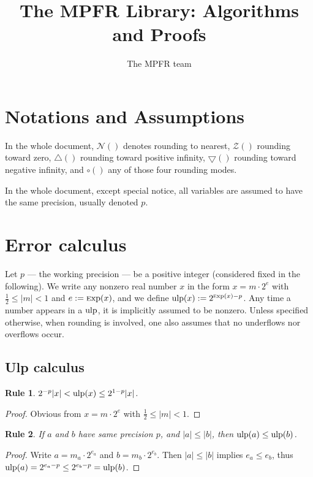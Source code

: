 \documentclass[12pt]{amsart}
\title{The MPFR Library: Algorithms and Proofs}
\author{The MPFR team}
\def\pinf{\bigtriangleup}
\def\minf{\bigtriangledown}
\def\ulp{{\rm ulp}}
\def\Exp{{\rm \textsc exp}}
\def\Z{{\mathcal Z}}
\def\N{{\mathcal N}}
\newtheorem{Rule}{Rule}
\begin{document}
\maketitle

\tableofcontents

\section{Notations and Assumptions}

In the whole document, $\N()$ denotes rounding to nearest,
$\Z()$ rounding toward zero,
$\pinf()$ rounding toward positive infinity,
$\minf()$ rounding toward negative infinity,
and $\circ()$ any of those four rounding modes.

In the whole document, except special notice, all variables are assumed
to have the same precision, usually denoted $p$.

\section{Error calculus}

Let $p$ --- the working precision ---
be a positive integer (considered fixed in the following).
We write any nonzero real number $x$ in the form $x = m \cdot 2^e$
with $\frac{1}{2} \le |m| < 1$ and $e := \Exp(x)$, and
we define $\ulp(x) := 2^{\Exp(x) - p}$.
Any time a number appears in a $\ulp$, it is implicitly assumed to be
nonzero. Unless specified otherwise, when rounding is involved, one
also assumes that no underflows nor overflows occur.

\subsection{Ulp calculus}


\begin{Rule} \label{R1}
$2^{-p} |x| < \ulp(x) \le 2^{1-p} |x|$.
\end{Rule}
\begin{proof}
Obvious from $x = m \cdot 2^e$ with $\frac{1}{2} \le |m| < 1$.
\end{proof}

\begin{Rule} \label{R2}
If $a$ and $b$ have same precision $p$,
and $|a| \le |b|$, then $\ulp(a) \le \ulp(b)$.
\end{Rule}
\begin{proof}
Write $a = m_a \cdot 2^{e_a}$ and $b = m_b \cdot 2^{e_b}$.
Then $|a| \le |b|$ implies $e_a \le e_b$, thus
$\ulp(a) = 2^{e_a-p} \le 2^{e_b-p} = \ulp(b)$.
\end{proof}
\end{document}
